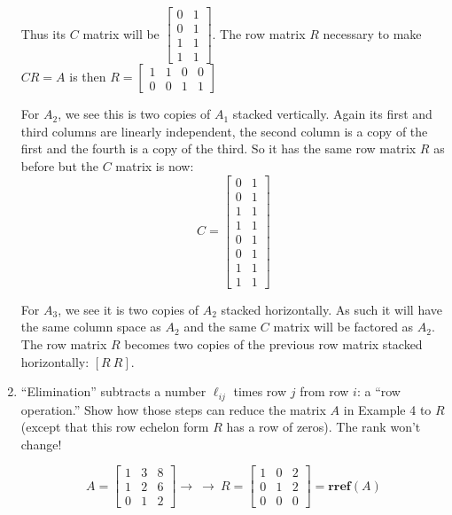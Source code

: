 \documentclass{scrartcl}
\begin{document}
\begin{enumerate}
Thus its $C$ matrix will be $\begin{bmatrix}
	0 & 1 \\ 0 & 1 \\ 1 & 1 \\ 1 & 1
\end{bmatrix}$. The row matrix $R$ necessary to make $CR = A$ is then $R = \begin{bmatrix}
	1 & 1 & 0 & 0 \\ 0 & 0 & 1 & 1 \end{bmatrix}$

For $A_2$, we see this is two copies of $A_1$ stacked vertically. Again its first and third columns are linearly independent, the second column is a copy of the first and the fourth is a copy of the third. So it has the same row matrix $R$ as before but the $C$ matrix is now:
$$C = \begin{bmatrix}
	0 & 1 \\ 0 & 1 \\ 1 & 1 \\ 1 & 1 \\0 & 1 \\ 0 & 1 \\ 1 & 1 \\ 1 & 1 
\end{bmatrix}$$

For $A_3$, we see it is two copies of $A_2$ stacked horizontally. As such it will have the same column space as $A_2$ and the same $C$ matrix will be factored as $A_2$. The row matrix $R$ becomes two copies of the previous row matrix stacked horizontally: $[R \ R]$.

\item ``Elimination'' subtracts a number $\ell_{ij}$ times row $j$ from row $i$: a ``row operation.'' Show how those steps can reduce the matrix $A$ in Example 4 to $R$ (except that this row echelon form $R$ has a row of zeros). The rank won't change!

$$A = \begin{bmatrix}
	1 & 3 & 8 \\ 1 & 2 & 6 \\ 0 & 1 & 2
\end{bmatrix}\rightarrow \ \rightarrow \ R = \begin{bmatrix}
	1 & 0 & 2 \\ 0 & 1 & 2 \\ 0 & 0 & 0
\end{bmatrix} = \textbf{rref}(A)$$


\end{enumerate}
\end{document}
